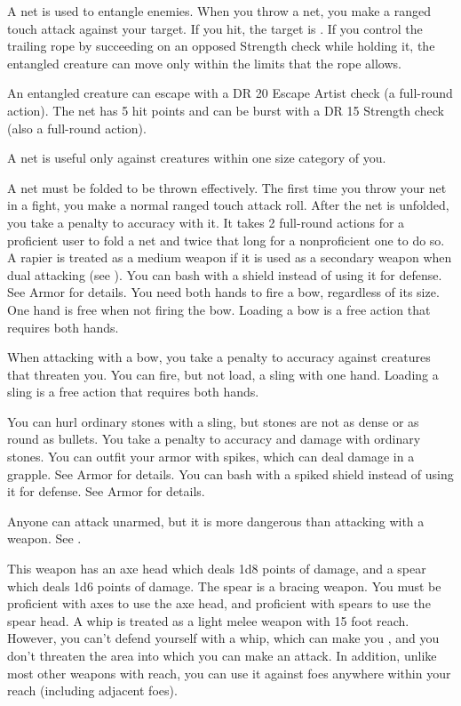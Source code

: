  A net is used to entangle enemies. When you throw a net, you make a ranged touch attack against your target. If you hit, the target is \entangled. If you control the trailing rope by succeeding on an opposed Strength check while holding it, the entangled creature can move only within the limits that the rope allows.
\par An entangled creature can escape with a DR 20 Escape Artist check (a full-round action). The net has 5 hit points and can be burst with a DR 15 Strength check (also a full-round action).
\par A net is useful only against creatures within one size category of you.
\par A net must be folded to be thrown effectively. The first time you throw your net in a fight, you make a normal ranged touch attack roll. After the net is unfolded, you take a  penalty to accuracy with it. It takes 2 full-round actions for a proficient user to fold a net and twice that long for a nonproficient one to do so.
 A rapier is treated as a medium weapon if it is used as a secondary weapon when dual attacking (see ).
 You can bash with a shield instead of using it for defense. See Armor for details.
 You need both hands to fire a bow, regardless of its size. One hand is free when not firing the bow. Loading a bow is a free action that requires both hands.
\par When attacking with a bow, you take a  penalty to accuracy against creatures that threaten you.
 You can fire, but not load, a sling with one hand. Loading a sling is a free action that requires both hands.
\par You can hurl ordinary stones with a sling, but stones are not as dense or as round as bullets. You take a  penalty to accuracy and damage with ordinary stones.
 You can outfit your armor with spikes, which can deal damage in a grapple. See Armor for details.
 You can bash with a spiked shield instead of using it for defense. See Armor for details.

 Anyone can attack unarmed, but it is more dangerous than attacking with a weapon. See .

 This weapon has an axe head which deals 1d8 points of damage, and a spear which deals 1d6 points of damage. The spear is a bracing weapon. You must be proficient with axes to use the axe head, and proficient with spears to use the spear head.
 A whip is treated as a light melee weapon with 15 foot reach. However, you can't defend yourself with a whip, which can make you , and you don't threaten the area into which you can make an attack. In addition, unlike most other weapons with reach, you can use it against foes anywhere within your reach (including adjacent foes).

